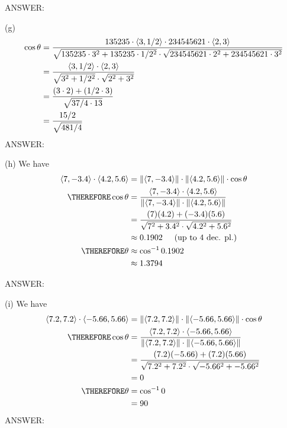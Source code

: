 ANSWER: 

(g)
\begin{align*}
\cos\theta &= \frac{135235 \cdot \langle 3, 1/2 \rangle \cdot 234545621 \cdot \langle 2, 3 \rangle}
{\sqrt{135235 \cdot 3^2 + 135235 \cdot 1/2^2} \cdot \sqrt{234545621 \cdot 2^2 + 234545621 \cdot 3^2}}\\
&= \frac{\langle 3, 1/2 \rangle \cdot \langle 2, 3 \rangle}{\sqrt{3^2 +1/2^2} \cdot \sqrt{2^2 + 3^2}}\\
&= \frac{(3 \cdot 2) +(1/2 \cdot 3)}{\sqrt{37/4 \cdot 13}}\\
&= \frac{15/2}{\sqrt{481/4}}
\end{align*} 
ANSWER: 

(h) 
We have
\begin{align*}
\vv{7}{-3.4} \cdot \vv{4.2}{5.6} &= \| \vv{7}{-3.4} \|  
                                    \cdot 
                                    \| \vv{4.2}{5.6} \| 
                                    \cdot
                                    \cos \theta
\\
\THEREFORE \cos\theta    &= \frac {\vv{7}{-3.4} \cdot \vv{4.2}{5.6}} 
                             {\| \vv{7}{-3.4} \|  \cdot \| \vv{4.2}{5.6} \| }
\\
                         &= \frac {(7)(4.2) + (-3.4)(5.6)}
                            {\sqrt{7^2 + 3.4^2} \cdot \sqrt{4.2^2 + 5.6^2}}
\\
                         &\approx 0.1902 \hspace{0.5cm} \text{(up to 4 dec. pl.)}
\\
\THEREFORE \theta        &\approx \cos^{-1} 0.1902 
\\
                         &\approx 1.3794
\end{align*}

ANSWER: 

(i) 
We have
\begin{align*}
\vv{7.2}{7.2} \cdot \vv{-5.66}{5.66} &= \| \vv{7.2}{7.2} \|  
                                    \cdot 
                                    \| \vv{-5.66}{5.66} \| 
                                    \cdot
                                    \cos \theta
\\
\THEREFORE \cos\theta    &= \frac {\vv{7.2}{7.2} \cdot \vv{-5.66}{5.66}} 
                             {\| \vv{7.2}{7.2} \|  \cdot \| \vv{-5.66}{5.66} \| }
\\
                         &= \frac {(7.2)(-5.66) + (7.2)(5.66)}
                            {\sqrt{7.2^2 + 7.2^2} \cdot \sqrt{-5.66^2 + -5.66^2}}
\\
                         &= 0 \\
\THEREFORE \theta        &= \cos^{-1} 0 
\\
                         &= 90
\end{align*}
ANSWER: 

